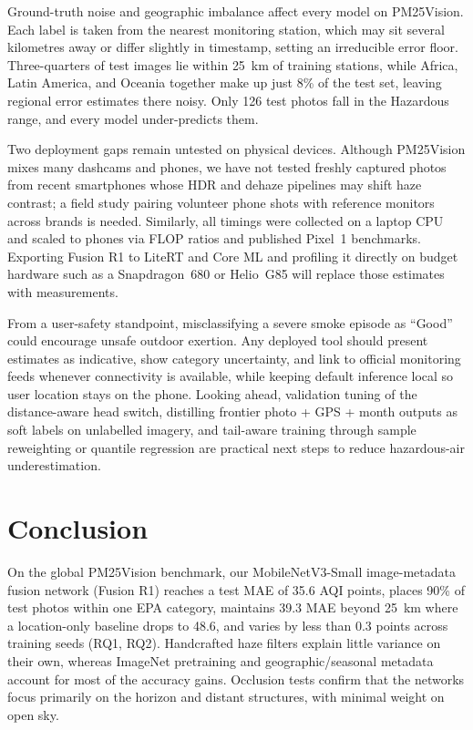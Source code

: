 \documentclass[conference]{IEEEtran}
\begin{document}
Ground-truth noise and geographic imbalance affect every model on PM25Vision.
Each label is taken from the nearest monitoring station, which may sit several
kilometres away or differ slightly in timestamp, setting an irreducible error
floor. Three-quarters of test images lie within 25~km of training stations,
while Africa, Latin America, and Oceania together make up just 8\% of the test
set, leaving regional error estimates there noisy. Only 126 test photos fall in
the Hazardous range, and every model under-predicts them.

Two deployment gaps remain untested on physical devices. Although PM25Vision
mixes many dashcams and phones, we have not tested freshly captured photos from
recent smartphones whose HDR and dehaze pipelines may shift haze contrast; a
field study pairing volunteer phone shots with reference monitors across brands
is needed. Similarly, all timings were collected on a laptop CPU and scaled to
phones via FLOP ratios and published Pixel~1 benchmarks. Exporting Fusion R1 to
LiteRT and Core ML and profiling it directly on budget hardware such as a
Snapdragon~680 or Helio~G85 will replace those estimates with measurements.

From a user-safety standpoint, misclassifying a severe smoke episode as ``Good''
could encourage unsafe outdoor exertion. Any deployed tool should present
estimates as indicative, show category uncertainty, and link to official
monitoring feeds whenever connectivity is available, while keeping default
inference local so user location stays on the phone. Looking ahead, validation
tuning of the distance-aware head switch, distilling frontier photo + GPS +
month outputs as soft labels on unlabelled imagery, and tail-aware training
through sample reweighting or quantile regression are practical next steps to
reduce hazardous-air underestimation.

\section{Conclusion}
\label{sec:conclusion}

On the global PM25Vision benchmark, our MobileNetV3-Small image-metadata fusion
network (Fusion R1) reaches a test MAE of 35.6 AQI points, places 90\% of test
photos within one EPA category, maintains 39.3 MAE beyond 25~km where a
location-only baseline drops to 48.6, and varies by less than 0.3 points across
training seeds (RQ1, RQ2). Handcrafted haze filters explain little variance on
their own, whereas ImageNet pretraining and geographic/seasonal metadata account
for most of the accuracy gains. Occlusion tests confirm that the networks focus
primarily on the horizon and distant structures, with minimal weight on open
sky.
\end{document}
